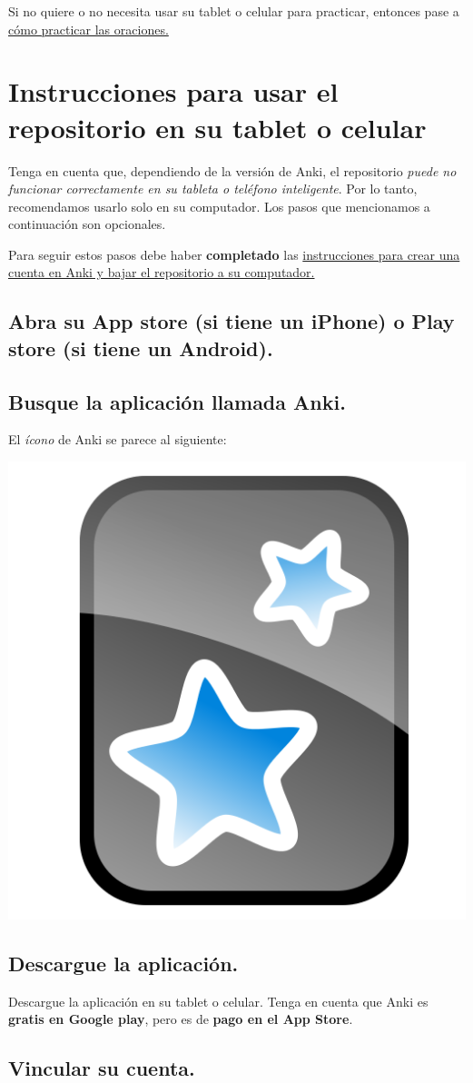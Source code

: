 \documentclass[
]{book}
\begin{document}
Si no quiere o no necesita usar su tablet o celular para practicar, entonces pase a \hyperref[cross_4]{cómo practicar las oraciones.}

\chapter{Instrucciones para usar el repositorio en su tablet o celular}\label{instrucciones-para-usar-el-repositorio-en-su-tablet-o-celular}

Tenga en cuenta que, dependiendo de la versión de Anki, el repositorio \emph{puede no funcionar correctamente en su tableta o teléfono inteligente}. Por lo tanto, recomendamos usarlo solo en su computador. Los pasos que mencionamos a continuación son opcionales.

Para seguir estos pasos debe haber \textbf{completado} las \hyperref[cross_0]{instrucciones para crear una cuenta en Anki y bajar el repositorio a su computador.}

\section{Abra su App store (si tiene un iPhone) o Play store (si tiene un Android).}\label{abra-su-app-store-si-tiene-un-iphone-o-play-store-si-tiene-un-android.}

\section{Busque la aplicación llamada Anki.}\label{busque-la-aplicaciuxf3n-llamada-anki.}

El \emph{ícono} de Anki se parece al siguiente:

\includegraphics[width=0.1\linewidth]{images/reposit_sp/Anki_logo}

\section{Descargue la aplicación.}\label{descargue-la-aplicaciuxf3n.}

Descargue la aplicación en su tablet o celular. Tenga en cuenta que Anki es \textbf{gratis en Google play}, pero es de \textbf{pago en el App Store}.

\section{Vincular su cuenta.}\label{vincular-su-cuenta.}
\end{document}
